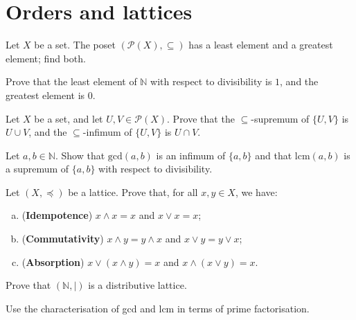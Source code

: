 \section{Orders and lattices}


\begin{exercise}
Let $X$ be a set. The poset $(\mathcal{P}(X), \subseteq)$ has a least element and a greatest element; find both.
\end{exercise}

\begin{exercise}
Prove that the least element of $\mathbb{N}$ with respect to divisibility is $1$, and the greatest element is $0$.
\end{exercise}


\begin{exercise}
Let $X$ be a set, and let $U,V \in \mathcal{P}(X)$. Prove that the $\subseteq$-supremum of $\{ U, V \}$ is $U \cup V$, and the $\subseteq$-infimum of $\{ U, V \}$ is $U \cap V$.
\end{exercise}

\begin{exercise}
Let $a,b \in \mathbb{N}$. Show that $\mathrm{gcd}(a,b)$ is an infimum of $\{ a, b \}$ and that $\mathrm{lcm}(a,b)$ is a supremum of $\{ a, b \}$ with respect to divisibility.
\end{exercise}


\begin{exercise}
Let $(X, \preceq)$ be a lattice. Prove that, for all $x,y \in X$, we have:
\begin{enumerate}[(a)]
\item (\textbf{Idempotence}) $x \wedge x = x$ and $x \vee x = x$;
\item (\textbf{Commutativity}) $x \wedge y = y \wedge x$ and $x \vee y = y \vee x$;
\item (\textbf{Absorption}) $x \vee (x \wedge y) = x$ and $x \wedge (x \vee y) = x$.
\end{enumerate}
\end{exercise}


\begin{exercise}
\label{exNIsDistributiveLatticeUnderDivisibility}
Prove that $(\mathbb{N}, {\mid})$ is a distributive lattice.
\begin{backhint}
Use the characterisation of gcd and lcm in terms of prime factorisation.
\end{backhint}
\end{exercise}


